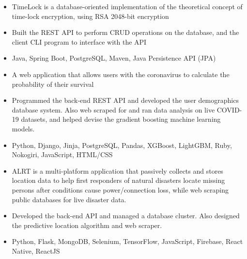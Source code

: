 \documentclass[11pt,letterpaper]{article}
\begin{document}
  \iftimelock
    {\fontsize{12}{12}}

    \begin{itemize}
      \item{TimeLock is a database-oriented implementation of the theoretical concept of time-lock encryption, using RSA 2048-bit encryption}

      \item{Built the REST API to perform CRUD operations on the database, and the client CLI program to interface with the API}

      \item{
        {}
        Java, Spring Boot, PostgreSQL, Maven, Java Persistence API (JPA)
      }
    \end{itemize}
  \fi

  \ifcovidsurvivalcalculator
    {\fontsize{12}{12}}

    \begin{itemize}
      \item{A web application that allows users with the coronavirus to calculate the probability of their survival}

      \item{Programmed the back-end REST API and developed the user demographics database system. Also web scraped for and ran data analysis on live COVID-19 datasets, and helped devise the gradient boosting machine learning models.}

      \item{
        {}
        Python, Django, Jinja, PostgreSQL, Pandas, XGBoost, LightGBM, Ruby, Nokogiri, JavaScript, HTML/CSS
      }
    \end{itemize}
  \fi

  \ifalrt
    {\fontsize{12}{12}}

    \begin{itemize}
      \item{ALRT is a multi-platform application that passively collects and stores location data to help first responders of natural disasters locate missing persons after conditions cause power/connection loss, while web scraping public databases for live disaster data.}

      \item{Developed the back-end API and managed a database cluster. Also designed the predictive location algorithm and web scraper.}

      \item{
        {}
        Python, Flask, MongoDB, Selenium, TensorFlow, JavaScript, Firebase, React Native, ReactJS
      }
    \end{itemize}
  \fi
\end{document}
